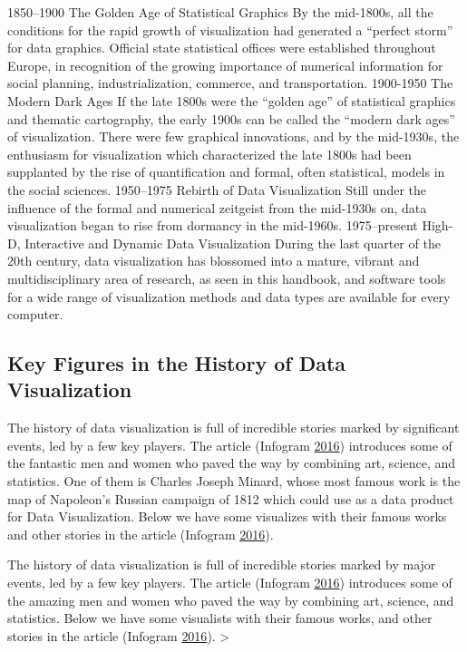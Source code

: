 \documentclass[]{book}
\theoremstyle{definition}
\theoremstyle{definition}
\theoremstyle{definition}
\theoremstyle{remark}
\begin{document}
1850--1900 \textbar{} The Golden Age of Statistical Graphics \textbar{}
By the mid-1800s, all the conditions for the rapid growth of
visualization had generated a ``perfect storm'' for data graphics.
Official state statistical offices were established throughout Europe,
in recognition of the growing importance of numerical information for
social planning, industrialization, commerce, and transportation.
1900-1950 \textbar{} The Modern Dark Ages \textbar{} If the late 1800s
were the ``golden age'' of statistical graphics and thematic
cartography, the early 1900s can be called the ``modern dark ages'' of
visualization. There were few graphical innovations, and by the
mid-1930s, the enthusiasm for visualization which characterized the late
1800s had been supplanted by the rise of quantification and formal,
often statistical, models in the social sciences. 1950--1975 \textbar{}
Rebirth of Data Visualization \textbar{} Still under the influence of
the formal and numerical zeitgeist from the mid-1930s on, data
visualization began to rise from dormancy in the mid-1960s.
1975--present \textbar{} High-D, Interactive and Dynamic Data
Visualization \textbar{} During the last quarter of the 20th century,
data visualization has blossomed into a mature, vibrant and
multidisciplinary area of research, as seen in this handbook, and
software tools for a wide range of visualization methods and data types
are available for every computer.

\subsection{Key Figures in the History of Data
Visualization}\label{key-figures-in-the-history-of-data-visualization}

The history of data visualization is full of incredible stories marked
by significant events, led by a few key players. The article (Infogram
\protect\hyperlink{ref-history_viz}{2016}) introduces some of the
fantastic men and women who paved the way by combining art, science, and
statistics. One of them is Charles Joseph Minard, whose most famous work
is the map of Napoleon's Russian campaign of 1812 which could use as a
data product for Data Visualization. Below we have some visualizes with
their famous works and other stories in the article (Infogram
\protect\hyperlink{ref-history_viz}{2016}).

The history of data visualization is full of incredible stories marked
by major events, led by a few key players. The article (Infogram
\protect\hyperlink{ref-history_viz}{2016}) introduces some of the
amazing men and women who paved the way by combining art, science, and
statistics. Below we have some visualists with their famous works, and
other stories in the article (Infogram
\protect\hyperlink{ref-history_viz}{2016}). \textgreater{}
\end{document}
